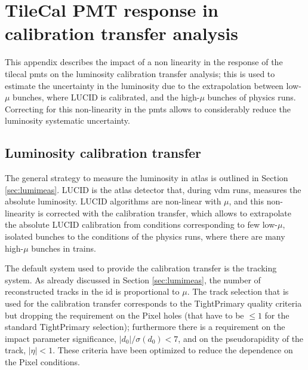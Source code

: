 \chapter{TileCal PMT response in calibration transfer analysis}
\label{app:pmt}

This appendix describes the impact of a non linearity in the response of the \gls{tilecal} \glspl{pmt} 
on the luminosity calibration transfer analysis; 
this is used to estimate the uncertainty in the luminosity due to the extrapolation between 
low-$\mu$ bunches, where LUCID is calibrated, and the high-$\mu$ bunches of physics runs. 
Correcting for this non-linearity in the \glspl{pmt} allows to considerably reduce the luminosity systematic uncertainty. 

\section{Luminosity calibration transfer}

The general strategy to measure the luminosity in \gls{atlas} is outlined in Section \ref{sec:lumimeas}.
LUCID is the \gls{atlas} detector that, during \gls{vdm} runs, measures the absolute luminosity. 
LUCID algorithms are non-linear with $\mu$, and this non-linearity is corrected with the calibration transfer, 
which  
allows to extrapolate the absolute LUCID calibration from conditions corresponding to few low-$\mu$, isolated bunches 
to the conditions of the physics runs, where there are many high-$\mu$ bunches in trains. 

The default system used to provide the calibration transfer is the tracking system. As already discussed in Section \ref{sec:lumimeas},
the number of reconstructed tracks in the \gls{id} is proportional to $\mu$. 
The track selection that is used for the calibration transfer corresponds to the TightPrimary quality criteria but dropping 
the requirement on the Pixel holes (that have to be $\leq 1$ for the standard TightPrimary selection);
furthermore there is a requirement on the impact parameter significance, $|d_0|/\sigma(d_0)<7$, and on 
the pseudorapidity of the track, $|\eta|<1$. These criteria have been optimized to reduce the dependence on the Pixel conditions. 

